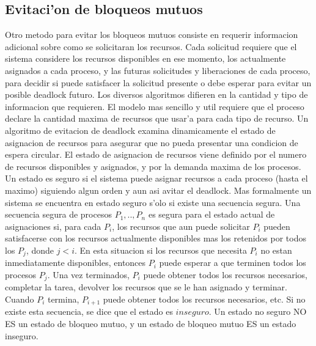 \documentclass[a4paper,10pt]{article}
\begin{document}
\subsection{Evitaci'on de bloqueos mutuos}
Otro metodo para evitar los bloqueos mutuos consiste en requerir informacion adicional sobre como se solicitaran los recursos. Cada solicitud requiere que el sistema considere los recursos disponibles en ese momento, los actualmente asignados a cada proceso, y las futuras solicitudes y liberaciones de cada proceso, para decidir si puede satisfacer la solicitud presente o debe esperar para evitar un posible deadlock futuro.
Los diversos algoritmos difieren en la cantidad y tipo de informacion que requieren. El modelo mas sencillo y util requiere que el proceso declare la cantidad maxima de recursos que usar'a para cada tipo de recurso. Un algoritmo de evitacion de deadlock examina dinamicamente el estado de asignacion de recursos para asegurar que no pueda presentar una condicion de espera circular. El estado de asignacion de recursos viene definido por el numero de recursos disponibles y asignados, y por la demanda maxima de los procesos. Un estado es seguro si el sistema puede asignar recursos a cada proceso (hasta el maximo) siguiendo algun orden y aun asi avitar el deadlock. Mas formalmente un sistema se encuentra en estado seguro s'olo si existe una secuencia segura. Una secuencia segura de procesos $P_{1},..,P_{n}$ es segura para el estado actual de asignaciones si, para cada $P_{i}$, los recursos que aun puede solicitar $P_{i}$ pueden satisfacerse con los recursos actualmente disponibles mas los retenidos por todos los $P_{j}$, donde $j<i$. En esta situacion si los recursos que necesita $P_{i}$ no estan inmediatamente disponibles, entonces $P_{i}$ puede esperar a que terminen todos los procesos $P_{j}$. Una vez terminados, $P_{i}$ puede obtener todos los recursos necesarios, completar la tarea, devolver los recursos que se le han asignado y terminar. Cuando $P_{i}$ termina, $P_{i+1}$ puede obtener todos los recursos necesarios, etc. Si no existe esta secuencia, se dice que el estado es $inseguro$.
Un estado no seguro NO ES un estado de bloqueo mutuo, y un estado de bloqueo mutuo ES un estado inseguro.



\end{document}
